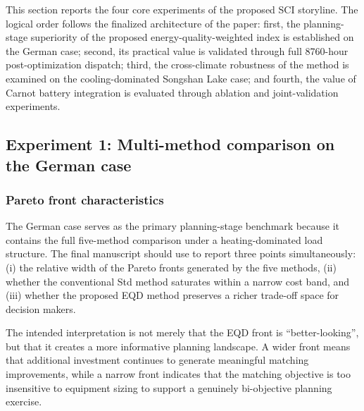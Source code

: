 
This section reports the four core experiments of the proposed SCI storyline. The logical order follows the finalized architecture of the paper: first, the planning-stage superiority of the proposed energy-quality-weighted index is established on the German case; second, its practical value is validated through full 8760-hour post-optimization dispatch; third, the cross-climate robustness of the method is examined on the cooling-dominated Songshan Lake case; and fourth, the value of Carnot battery integration is evaluated through ablation and joint-validation experiments.

\subsection{Experiment 1: Multi-method comparison on the German case}
\label{sec:exp1}

\subsubsection{Pareto front characteristics}

The German case serves as the primary planning-stage benchmark because it contains the full five-method comparison under a heating-dominated load structure. The final manuscript should use  to report three points simultaneously: (i) the relative width of the Pareto fronts generated by the five methods, (ii) whether the conventional Std method saturates within a narrow cost band, and (iii) whether the proposed EQD method preserves a richer trade-off space for decision makers.

The intended interpretation is not merely that the EQD front is ``better-looking'', but that it creates a more informative planning landscape. A wider front means that additional investment continues to generate meaningful matching improvements, while a narrow front indicates that the matching objective is too insensitive to equipment sizing to support a genuinely bi-objective planning exercise.

